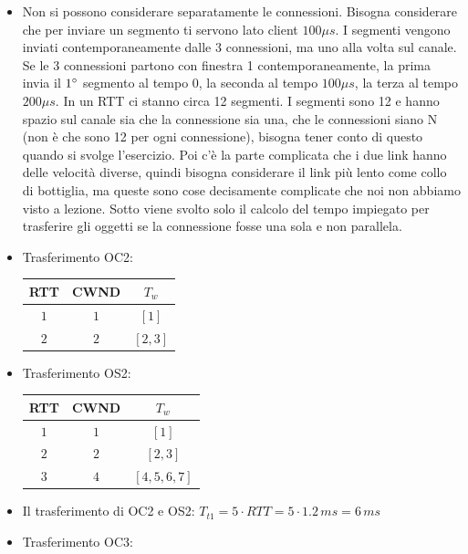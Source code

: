 \documentclass[10pt]{article}
\newcommand{\lightrule}{%
	\arrayrulecolor{black!30}%
	\midrule[\lightrulewidth]%
	\arrayrulecolor{black}}
\begin{document}
\begin{enumerate}
\begin{itemize}
			\item Non si possono considerare separatamente le connessioni. Bisogna considerare che per inviare un segmento ti servono lato client $100 \mu s$. I segmenti vengono inviati contemporaneamente dalle 3 connessioni, ma uno alla volta sul canale. Se le 3 connessioni partono con finestra 1 contemporaneamente, la prima invia il $1 \degree$ segmento al tempo 0, la seconda al tempo $100 \mu s$, la terza al tempo $200 \mu s$. In un RTT ci stanno circa 12 segmenti. I segmenti sono 12 e hanno spazio sul canale sia che la connessione sia una, che le connessioni siano N (non è che sono 12 per ogni connessione), bisogna tener conto di questo quando si svolge l'esercizio. Poi c'è la parte complicata che i due link hanno delle velocità diverse, quindi bisogna considerare il link più lento come collo di bottiglia, ma queste sono cose decisamente complicate che noi non abbiamo visto a lezione.
			Sotto viene svolto solo il calcolo del tempo impiegato per trasferire gli oggetti se la connessione fosse una sola e non parallela.
			\item Trasferimento OC2:
			\begin{center}
				\centering
 				\begin{tabular}{@{} *{3}{c} @{}}
 				\toprule
 					\textbf{RTT} & \textbf{CWND} & \textbf{$T_w$} \\
 				\midrule
 					$1$ & $1$ & $[1]$ \\ 
				\lightrule
 					$2$ & $2$ & $[2,3]$ \\
				\bottomrule
				\end{tabular}
			\end{center}
			\item Trasferimento OS2:
			\begin{center}
				\centering
 				\begin{tabular}{@{} *{3}{c} @{}}
 				\toprule
 					\textbf{RTT} & \textbf{CWND} & \textbf{$T_w$} \\
 				\midrule
 					$1$ & $1$ & $[1]$ \\ 
				\lightrule
 					$2$ & $2$ & $[2,3]$ \\
 				\lightrule
 					$3$ & $4$ & $[4,5,6,7]$ \\
				\bottomrule
				\end{tabular}
			\end{center}
			\smallskip
			\item Il trasferimento di OC2 e OS2: $T_{t1} = 5 \cdot RTT = 5 \cdot 1.2 \,ms = 6 \,ms$
			\item Trasferimento OC3:

\end{itemize}
\end{enumerate}
\end{document}
